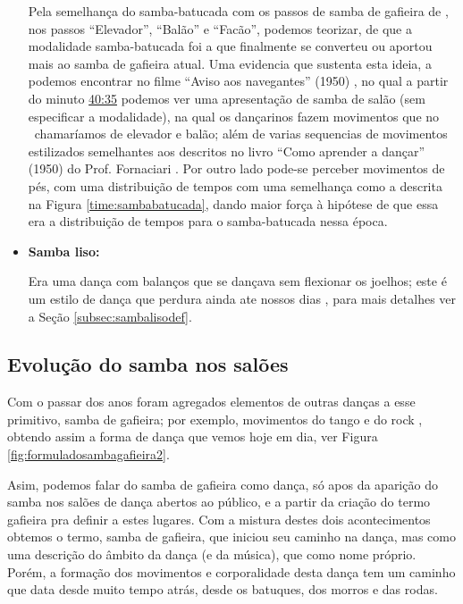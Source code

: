\begin{itemize}
Pela semelhança do samba-batucada com os passos de samba de gafieira de \AnoLivro,
nos passos ``Elevador'', ``Balão'' e ``Facão'', podemos teorizar, de que a modalidade samba-batucada foi
a que finalmente se converteu ou aportou mais ao samba de gafieira atual.
Uma evidencia que sustenta esta ideia, a podemos encontrar no filme ``Aviso aos navegantes'' (1950) \cite[min. 40:35]{AtlantidaDance},
no qual a partir do minuto \href{http://www.bcc.org.br/filmes/443382}{40:35} podemos ver uma apresentação de samba de salão (sem especificar a modalidade),
na qual os dançarinos fazem movimentos que no \AnoLivro~chamaríamos de elevador e balão; 
além de varias sequencias de movimentos estilizados semelhantes aos descritos no livro ``Como aprender a dançar'' (1950) do Prof. Fornaciari \cite[pp. 163]{fornaciari1950aprender}.
Por outro lado pode-se perceber movimentos de pés, 
com uma distribuição de tempos com uma semelhança como a descrita na Figura \ref{time:sambabatucada},
dando maior força à hipótese de que essa era a distribuição de tempos para o samba-batucada nessa época. 

\item \textbf{Samba liso:}

Era uma dança com balanços que se dançava sem flexionar os joelhos;
este é um estilo de dança que perdura ainda ate nossos 
dias \cite[pp. 58,62]{freitas1959danca} \cite[pp. 61]{fornaciari1950aprender} \cite[pp. 143]{perna2002samba}, 
para mais detalhes ver a Seção \ref{subsec:sambalisodef}.
\end{itemize}

\subsection{Evolução do samba nos salões}

Com o passar dos anos foram agregados elementos de outras danças a esse primitivo, samba de gafieira;
por exemplo, movimentos do tango e do rock \cite[pp. 142]{perna2002samba}, 
obtendo assim a forma de dança que vemos hoje em dia, ver Figura \ref{fig:formuladosambagafieira2}.

Asim, podemos falar do samba de gafieira como dança, só apos da aparição do samba nos
salões de dança abertos ao público, e a partir da criação do termo gafieira pra definir a estes lugares.
Com a mistura destes dois acontecimentos obtemos o termo, samba de gafieira,
que iniciou seu caminho na dança, mas como uma descrição do âmbito da dança (e da música), que como nome próprio.
Porém, a formação dos movimentos e corporalidade desta dança tem um caminho que data desde muito tempo atrás,
desde os batuques, dos morros e das rodas.


